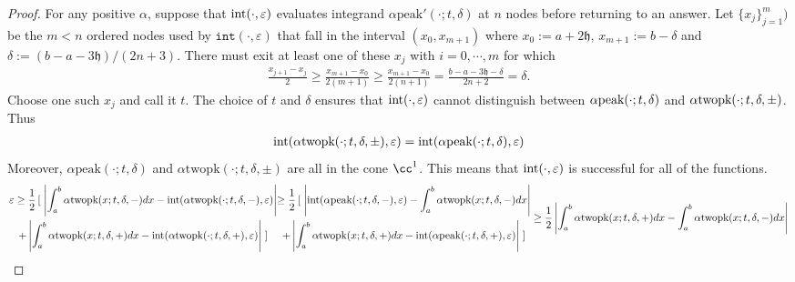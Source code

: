 \documentclass{iitthesis}
\theoremstyle{definition}
\theoremstyle{remark}
\begin{document}
\begin{proof}
  For any positive $\alpha$, suppose that $\textup{int}(\cdot,\varepsilon)$ evaluates integrand $\alpha\text{peak}'(\cdot;t,\delta)$ at $n$ nodes before returning to an answer. Let $\{x_j\}_{j=1}^{m})$ be the $m<n$ ordered nodes used by $\texttt{int}(\cdot,\varepsilon)$ that fall in the interval $(x_{0},x_{m+1})$ where $x_{0}:=a+2\mathfrak{h}$, $x_{m+1}:=b-\delta$ and $\delta:=(b-a-3\mathfrak{h})/(2n+3)$. There must exit at least one of these $x_{j}$ with $i=0,\cdots,m$ for which
  \begin{align*}
    \frac{x_{j+1}-x_{j}}{2}\ge\frac{x_{m+1}-x_{0}}{2(m+1)}\ge\frac{x_{m+1}-x_{0}}{2(n+1)}=\frac{b-a-3\mathfrak{h}-\delta}{2n+2}=\delta.
  \end{align*}
  Choose one such $x_{j}$ and call it $t$. The choice of $t$ and $\delta$ ensures that $\textup{int}(\cdot,\varepsilon)$ cannot distinguish between $\alpha\textup{peak}(\cdot;t,\delta)$ and $\alpha\textup{twopk}(\cdot;t,\delta,\pm)$. Thus
  \begin{align*}
    \textup{int}(\alpha\text{twopk}(\cdot;t,\delta,\pm),\varepsilon)=\textup{int}(\alpha\text{peak}(\cdot;t,\delta),\varepsilon)
  \end{align*}
  Moreover, $\alpha\text{peak}(\cdot;t,\delta)$ and $\alpha\text{twopk}(\cdot;t,\delta,\pm)$ are all in the cone $\cc^1$. This means that $\textup{int}(\cdot,\varepsilon)$ is successful for all of the functions.
  \begin{subequations}
  \begin{multline*}
    \varepsilon\ge\frac{1}{2}\left[\right.\left|\int_{a}^{b}\alpha\textup{twopk}(x;t,\delta,-)dx-\textup{int}(\alpha\textup{twopk}(\cdot;t,\delta,-),\varepsilon)\right|\\
    +\left|\int_{a}^{b}\alpha\textup{twopk}(x;t,\delta,+)dx-\textup{int}(\alpha\textup{twopk}(\cdot;t,\delta,+),\varepsilon)\right|\left.\right]
  \end{multline*}
  \begin{multline*}
    \ge\frac{1}{2}\left[\right.\left|\textup{int}(\alpha\textup{peak}(\cdot;t,\delta,-),\varepsilon)-\int_{a}^{b}\alpha\textup{twopk}(x;t,\delta,-)dx\right|\\
    +\left|\int_{a}^{b}\alpha\textup{twopk}(x;t,\delta,+)dx-\textup{int}(\alpha\textup{peak}(\cdot;t,\delta,+),\varepsilon)\right|\left.\right]
  \end{multline*}
  \begin{align*}
     &\ge\frac{1}{2}\left|\int_{a}^{b}\alpha\textup{twopk}(x;t,\delta,+)dx-\int_{a}^{b}\alpha\textup{twopk}(x;t,\delta,-)dx\right|\\

\end{align*}
\end{subequations}
\end{proof}
\end{document}
